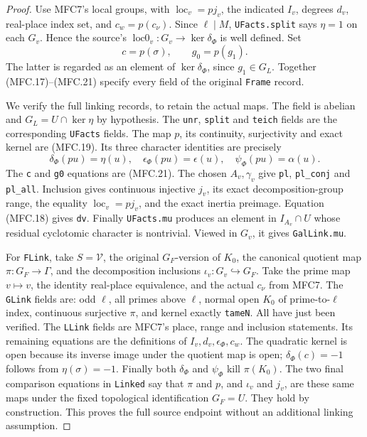 \documentclass[11pt,a4paper]{article}
\numberwithin{equation}{section}
\theoremstyle{remark}\newtheorem{remark}[theorem]{Remark}
\begin{document}
\begin{proof}
Use MFC7's local groups, with \(\operatorname{loc}_v=pj_v\),
the indicated \(I_v\), degrees \(d_v\), real-place index set,
and \(c_w=p(c_\nu)\).  Since \(\ell\mid M\), \texttt{UFacts.\allowbreak split}
says \(\eta=1\) on each \(G_v\).  Hence the source's
\(\operatorname{loc0}_v:G_v\to\ker\delta_\Phi\) is well
defined.  Set
\[
                    c=p(\sigma),\qquad g_0=p(g_1).
                                                               \tag{MFC.21}
\]
The latter is regarded as an element of \(\ker\delta_\Phi\),
since \(g_1\in G_L\).  Together (MFC.17)--(MFC.21) specify
every field of the original \texttt{Frame} record.

We verify the full linking records, to retain the actual maps.
The field is abelian and \(G_L=U\cap\ker\eta\) by hypothesis.
The \texttt{unr}, \texttt{split} and \texttt{teich} fields are
the corresponding \texttt{UFacts} fields.  The map \(p\), its
continuity, surjectivity and exact kernel are (MFC.19).  Its three
character identities are precisely
\[
 \delta_\Phi(pu)=\eta(u),\quad
 \epsilon_\Phi(pu)=\epsilon(u),\quad
 \psi_\Phi(pu)=\alpha(u).                                 \tag{MFC.22}
\]
The \texttt{c} and \texttt{g0} equations are (MFC.21).
The chosen \(A_v,\gamma_v\) give \texttt{pl}, \texttt{pl\_\allowbreak conj}
and \texttt{pl\_\allowbreak all}.  Inclusion gives continuous injective
\(j_v\), its exact decomposition-group range, the equality
\(\operatorname{loc}_v=pj_v\), and the exact inertia preimage.
Equation (MFC.18) gives \texttt{dv}.  Finally
\texttt{UFacts.\allowbreak mu} produces an element in \(I_{A_v}\cap U\)
whose residual cyclotomic character is nontrivial.  Viewed in
\(G_v\), it gives \texttt{Gal\allowbreak Link.\allowbreak mu}.

For \texttt{FLink}, take \(S=\mathcal V\), the original
\(G_F\)-version of \(K_0\), the canonical quotient map
\(\pi:G_F\to\Gamma\), and the decomposition inclusions
\(\iota_v:G_v\hookrightarrow G_F\).  Take the prime map
\(v\mapsto v\), the identity real-place equivalence, and the
actual \(c_\nu\) from MFC7.  The \texttt{GLink} fields are:
odd \(\ell\), all primes above \(\ell\), normal open
\(K_0\) of prime-to-\(\ell\) index, continuous surjective
\(\pi\), and kernel exactly \texttt{tame\allowbreak N}.  All have just
been verified.  The \texttt{LLink} fields are MFC7's place,
range and inclusion statements.  Its remaining equations are
the definitions of \(I_v,d_v,\epsilon_\Phi,c_w\).
The quadratic kernel is open because its inverse image under
the quotient map is open; \(\delta_\Phi(c)=-1\) follows
from \(\eta(\sigma)=-1\).  Finally both \(\delta_\Phi\)
and \(\psi_\Phi\) kill \(\pi(K_0)\).
The two final comparison equations in \texttt{Linked} say
that \(\pi\) and \(p\), and \(\iota_v\) and \(j_v\),
are these same maps under the fixed topological identification
\(G_F=U\).  They hold by construction.  This proves the full
source endpoint without an additional linking assumption.
\end{proof}
\end{document}
